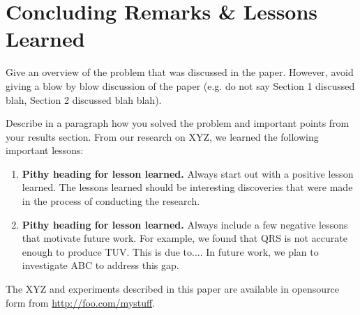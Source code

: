 \section{Concluding Remarks \& Lessons Learned}
\label{conclusion}

Give an overview of the problem that was discussed in the
paper. However, avoid giving a blow by blow
discussion of the paper (e.g. do not say
Section 1 discussed blah, Section 2 discussed
blah blah).

Describe in a paragraph how you solved the problem
and important points from your results section.
From our research on XYZ, we learned the following
important lessons:

\begin{enumerate}

\item \textbf{Pithy heading for lesson learned.} Always
start out with a positive lesson learned. The lessons
learned should be interesting discoveries that were
made in the process of conducting the research.

\item \textbf{Pithy heading for lesson learned.} Always
include a few negative lessons that motivate future
work. For example, we found that QRS is not accurate
enough to produce TUV. This is due to.... In future
work, we plan to investigate ABC to address this gap.

\end{enumerate}

The XYZ and experiments described in this paper are available in
opensource form from \url{http://foo.com/mystuff}.
